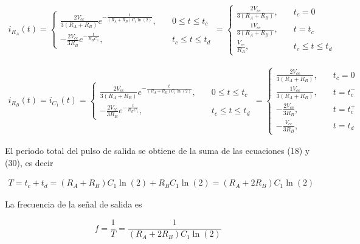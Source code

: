 \documentclass{article}
\begin{document}
\begin{tcolorbox}[colback=red!5!white,colframe=red!75!black,arc=0mm,boxrule=0mm,width=(\linewidth+0.5cm)]
	\begin{align}
		i_{R_A}(t) = 
		\begin{cases}
			 \frac{2V_{cc}}{3(R_A + R_B)} e^{-\frac{t}{(R_A + R_B)C_1\ln(2)}}, &\quad 0 \leq t \leq  t_c \\
			-\frac{2V_{cc}}{3R_B}e^{-\frac{t}{R_BC_1}}, &\quad t_c \leq t \leq t_d
		\end{cases}	=
		\begin{cases}
			\frac{2V_{cc}}{3(R_A + R_B)}, &\quad t_c = 0 \\
			\frac{1V_{cc}}{3(R_A + R_B)}, &\quad t = t_c \\
			\frac{V_{cc}}{R_A}, &\quad t_c \leq t \leq t_d 
		\end{cases}
	\end{align}
\end{tcolorbox}

\begin{tcolorbox}[colback=red!5!white,colframe=red!75!black,arc=0mm,boxrule=0mm,width=(\linewidth+0.5cm)]
	\begin{align}
		i_{R_B}(t) = i_{C_1}(t)=
		\begin{cases}
			\frac{2V_{cc}}{3(R_A + R_B)} e^{-\frac{t}{(R_A + R_B)C_1\ln(2)}}, &\quad 0 \leq t \leq  t_c \\
			-\frac{2V_{cc}}{3R_B}e^{-\frac{t}{R_BC_1}}, &\quad t_c \leq t \leq t_d
		\end{cases}	=
		\begin{cases}
			\frac{2V_{cc}}{3(R_A + R_B)}, &\quad t_c = 0 \\
			\frac{1V_{cc}}{3(R_A + R_B)}, &\quad t = t_c^{-}  \\
			-\frac{2V_{cc}}{3R_B}, &\quad t = t_c^{+} \\
			-\frac{V_{cc}}{3R_B}, &\quad t = t_d
		\end{cases}
	\end{align}
\end{tcolorbox}

El periodo total del pulso de salida se obtiene de la suma de las ecuaciones (18) y (30), es decir

\begin{align}
	T = t_c + t_d = (R_A + R_B)C_1 \ln(2) + R_BC_1 \ln(2) = (R_A + 2R_B)C_1 \ln(2)
\end{align}

La frecuencia de la señal de salida es
\begin{tcolorbox}[colback=red!5!white,colframe=red!75!black,arc=0mm,boxrule=0mm,width=(\linewidth+0.5cm)]
	\begin{equation}
		f = \frac{1}{T} = \frac{1}{(R_A + 2R_B)C_1 \ln(2)}
	\end{equation}
\end{tcolorbox}
\end{document}
